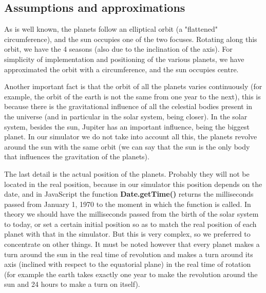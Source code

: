 \documentclass{article}
\begin{document}
\subsection{Assumptions and approximations}
As is well known, the planets follow an elliptical orbit (a "flattened" circumference), and the sun occupies one of the two focuses. Rotating along this orbit, we have the 4 seasons (also due to the inclination of the axis). For simplicity of implementation and positioning of the various planets, we have approximated the orbit with a circumference, and the sun occupies  centre. \newline
\par Another important fact is that the orbit of all the planets varies continuously (for example, the orbit of the earth is not the same from one year to the next), this is because there is the gravitational influence of all the celestial bodies present in the universe (and in particular in the solar system, being closer). In the solar system, besides the sun, Jupiter has an important influence, being the biggest planet. In our simulator we do not take into account all this, the planets revolve around the sun with the same orbit (we can say that the sun is the only body that influences the gravitation of the planets). \newline
\par The last detail is the actual position of the planets. Probably they will not be located in the real position, because in our simulator this position depends on the date, and in JavaScript the function \textbf{Date.getTime()} returns the milliseconds passed from January 1, 1970 to the moment in which the function is called. In theory we should have the milliseconds passed from the birth of the solar system to today, or set a certain initial position so as to match the real position of each planet with that in the simulator. But this is very complex, so we preferred to concentrate on other things. It must be noted however that every planet makes a turn around the sun in the real time of revolution and makes a turn around its axis (inclined with respect to the equatorial plane) in the real time of rotation (for example the earth takes exactly one year to make the revolution around the sun and 24 hours to make a turn on itself).\cite{solarsystemrealpositon}\cite{earthcloudsradiustexture}
\end{document}
